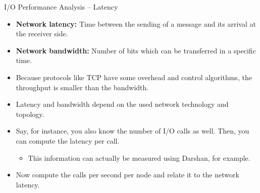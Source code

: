 \documentclass[compress,11pt,xcolor=svgnames,aspectratio=169]{beamer}
\begin{document}
\begin{frame}[fragile]{I/O Performance Analysis -- Latency}

\begin{itemize}
\setlength\itemsep{0.3cm}

  \item \textbf{Network latency:} Time between the sending of a message and its arrival at the receiver side.

  \item \textbf{Network bandwidth:} Number of bits which can be transferred in a specific time.

  \item Because protocols like TCP have some overhead and control algorithms, the throughput is smaller than the bandwidth.

  \item Latency and bandwidth depend on the used network technology and topology.

  \item Say, for instance, you also know the number of I/O calls as well. Then, you can compute the latency per call.

    \begin{itemize}
    \setlength\itemsep{0.3cm}
      \item This information can actually be measured using Darshan, for example.
    \end{itemize}

  \item Now compute the calls per second per node and relate it to the network latency.

\end{itemize}

\end{frame}
\end{document}

